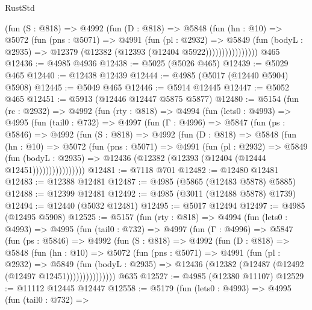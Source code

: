 \begin{lexlean}{RustStd}
\begin{coremodule}
                  (fun (S : @818) =>
                  @4992
                    (fun (D : @818) =>
                    @5848
                      (fun (hn : @10) =>
                      @5072
                        (fun (pns : @5071) =>
                        @4991
                          (fun (pl : @2932) =>
                          @5849
                            (fun (bodyL : @2935) =>
                            @12379 (@12382 (@12393 (@12404 @5922))))))))))))))))
    @465
@12436 := @4985 @4936
@12438 := @5025 (@5026 @465)
@12439 := @5029 @465
@12440 := @12438 @12439
@12444 := @4985 (@5017 (@12440 @5904) @5908)
@12445 := @5049 @465
@12446 := @5914 @12445
@12447 := @5052 @465
@12451 := @5913 (@12446 @12447 @5875 @5877)
@12480 := @5154
    (fun (rc : @2932) =>
    @4992
      (fun (rty : @818) =>
      @4994
        (fun (lets0 : @4993) =>
        @4995
          (fun (tail0 : @732) =>
          @4997
            (fun (Γ : @4996) =>
            @5847
              (fun (ps : @5846) =>
              @4992
                (fun (S : @818) =>
                @4992
                  (fun (D : @818) =>
                  @5848
                    (fun (hn : @10) =>
                    @5072
                      (fun (pns : @5071) =>
                      @4991
                        (fun (pl : @2932) =>
                        @5849
                          (fun (bodyL : @2935) =>
                          @12436 (@12382 (@12393 (@12404 (@12444 @12451))))))))))))))))
@12481 := @7118 @701
@12482 := @12480 @12481
@12483 := @12388 @12481
@12487 := @4985 (@5865 (@12483 @5878) @5885)
@12488 := @12399 @12481
@12492 := @4985 (@3011 (@12488 @5878) @1739)
@12494 := @12440 (@5032 @12481)
@12495 := @5017 @12494
@12497 := @4985 (@12495 @5908)
@12525 := @5157
    (fun (rty : @818) =>
    @4994
      (fun (lets0 : @4993) =>
      @4995
        (fun (tail0 : @732) =>
        @4997
          (fun (Γ : @4996) =>
          @5847
            (fun (ps : @5846) =>
            @4992
              (fun (S : @818) =>
              @4992
                (fun (D : @818) =>
                @5848
                  (fun (hn : @10) =>
                  @5072
                    (fun (pns : @5071) =>
                    @4991
                      (fun (pl : @2932) =>
                      @5849
                        (fun (bodyL : @2935) =>
                        @12436 (@12382 (@12487 (@12492 (@12497 @12451)))))))))))))))
    @635
@12527 := @4985 (@12380 @11107)
@12529 := @11112 @12445 @12447
@12558 := @5179
    (fun (lets0 : @4993) =>
    @4995
      (fun (tail0 : @732) =>

\end{coremodule}
\end{lexlean}
